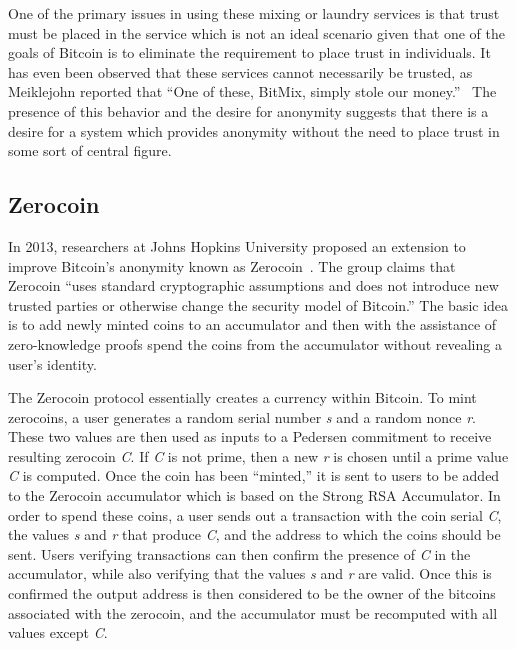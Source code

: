 \documentclass[11pt]{article}
\begin{document}
One of the primary issues in using these mixing or laundry services is that trust must be placed in the service which is
not an ideal scenario given that one of the goals of Bitcoin is to eliminate the requirement to place trust in
individuals. It has even been observed that these services cannot necessarily be trusted, as Meiklejohn reported that
``One of these, BitMix, simply stole our money.''~\cite{meiklejohn13} The presence of this behavior and the desire for
anonymity suggests that there is a desire for a system which provides anonymity without the need to place trust in some
sort of central figure.

\subsection{Zerocoin}
In 2013, researchers at Johns Hopkins University proposed an extension to improve Bitcoin's anonymity known as
Zerocoin~\cite{miers13}. The group claims that Zerocoin ``uses standard cryptographic assumptions and does not introduce
new trusted parties or otherwise change the security model of Bitcoin.'' The basic idea is to add newly minted coins to
an accumulator and then with the assistance of zero-knowledge proofs spend the coins from the accumulator without
revealing a user's identity.

The Zerocoin protocol essentially creates a currency within Bitcoin. To mint zerocoins, a user generates a random serial
number \emph{s} and a random nonce \emph{r}. These two values are then used as inputs to a Pedersen commitment to
receive resulting zerocoin \emph{C}. If \emph{C} is not prime, then a new \emph{r} is chosen until a prime value
\emph{C} is computed. Once the coin has been ``minted,'' it is sent to users to be added to the Zerocoin accumulator
which is based on the Strong RSA Accumulator. In order to spend these coins, a user sends out a transaction with the
coin serial \emph{C}, the values \emph{s} and \emph{r} that produce \emph{C}, and the address to which the coins should
be sent. Users verifying transactions can then confirm the presence of \emph{C} in the accumulator, while also verifying
that the values \emph{s} and \emph{r} are valid. Once this is confirmed the output address is then considered to be the
owner of the bitcoins associated with the zerocoin, and the accumulator must be recomputed with all values except
\emph{C}.
\end{document}
